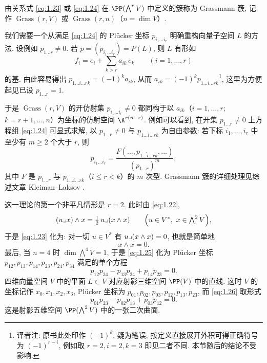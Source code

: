 \begin{example}[Grassmann 簇]
	由关系式 \eqref{eq:1.23} 或 \eqref{eq:1.24} 在 $\PP(\bigwedge^r V)$ 中定义的簇称为 Grassmann 簇, 记作 $\operatorname{Grass}(r, V)$ 或 $\operatorname{Grass}(r, n)$（$n = \dim V$）.

	我们需要一个从满足 \eqref{eq:1.24} 的 Plücker 坐标 $p_{i_1 \ldots i_r}$ 明确重构向量子空间 $L$ 的方法. 设例如 $p_{1 \ldots r} \ne 0$. 若 $p = (p_{i_1 \ldots i_r}) = P(L)$, 则 $L$ 有形如
	\[
		f_i = e_i + \sum_{k > r} a_{ik}\, e_k \qquad (i = 1, \ldots, r)
	\]
	的基. 由此容易得出 $p_{1 \ldots \widehat{i} \ldots r k} = (-1)^k a_{ik}$, 从而 $a_{ik} = (-1)^k p_{1 \ldots \widehat{i} \ldots r k}$\footnote{译者注: 原书此处印作 $(-1)^k$, 疑为笔误; 按定义直接展开外积可得正确符号为 $(-1)^{r-i}$, 例如取 $r = 2, i = 2, k = 3$ 即见二者不同. 本节随后的结论不受影响.}, 这里为方便起见已设 $p_{1 \ldots r} = 1$.

	于是 $\operatorname{Grass}(r, V)$ 的开仿射集 $p_{i_1 \ldots i_r} \ne 0$ 都同构于以 $a_{ik}$（$i = 1, \ldots, r$; $k = r+1, \ldots, n$）为坐标的仿射空间 $\A^{r(n-r)}$. 例如可以看到, 在开集 $p_{1 \ldots r} \ne 0$ 上方程组 \eqref{eq:1.24} 可显式求解, 以 $p_{1 \ldots r} \ne 0$ 与 $p_{1 \ldots \widehat{i} \ldots r k}$ 为自由参数: 若下标 $i_1, \ldots, i_r$ 中至少有 $m \ge 2$ 个大于 $r$, 则
	\[
		p_{i_1 \ldots i_r} = \frac{F(\ldots, p_{1 \ldots \widehat{i} \ldots r k}, \ldots)}{(p_{1 \ldots r})^m},
	\]
	其中 $F$ 是 $p_{1 \ldots r}$ 与 $p_{1 \ldots \widehat{i} \ldots r k}$（$i \le r < k$）的 $m$ 次型. Grassmann 簇的详细处理见综述文章 Kleiman--Laksov \cite{kleiman-laksov1972}.

	这一理论的第一个非平凡情形是 $r = 2$. 此时由 \eqref{eq:1.22},
	\[
		(u \lrcorner x) \wedge x = \tfrac{1}{2}\, u \lrcorner (x \wedge x) \qquad \Bigl( u \in V^*,\ x \in \textstyle\bigwedge^2 V \Bigr),
	\]
	于是 \eqref{eq:1.23} 化为: 对一切 $u \in V^*$ 有 $u \lrcorner (x \wedge x) = 0$, 也就是简单地
	\begin{equation}
		\label{eq:1.25}
		x \wedge x = 0.
	\end{equation}
	最后, 当 $n = 4$ 时 $\dim \bigwedge^4 V = 1$, 于是 \eqref{eq:1.25} 化为 Plücker 坐标 $p_{12}, p_{13}, p_{14}, p_{23}, p_{24}, p_{34}$ 满足的单个方程
	\begin{equation}
		\label{eq:1.26}
		p_{12} p_{34} - p_{13} p_{24} + p_{14} p_{23} = 0.
	\end{equation}
	四维向量空间 $V$ 中的平面 $L \subset V$ 对应射影三维空间 $\PP(V)$ 中的直线. 这时 $V$ 的坐标记作 $x_0, x_1, x_2, x_3$, Plücker 坐标为 $p_{01}, p_{02}, p_{03}, p_{12}, p_{13}, p_{23}$, 而 \eqref{eq:1.26} 取形式
	\begin{equation}
		\label{eq:1.27}
		p_{01} p_{23} - p_{02} p_{13} + p_{03} p_{12} = 0.
	\end{equation}
	这是射影五维空间 $\PP(\bigwedge^2 V)$ 中的一张二次曲面.
\end{example}

